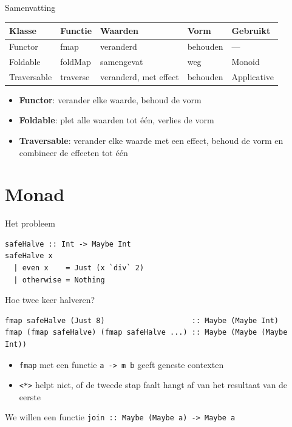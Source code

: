 \documentclass[aspectratio=169,11pt]{beamer}
\newcommand{\hs}{\lstinline[style=hsinline]}
\newcommand{\code}[1]{{\ttfamily\color{kuldonker}#1}}
\begin{document}
\begin{frame}{Samenvatting}
  \centering
  \begin{tabular}{lllll}
    \toprule
    \textbf{Klasse} & \textbf{Functie} & \textbf{Waarden} & \textbf{Vorm} & \textbf{Gebruikt} \\
    \midrule
    \code{Functor}     & \code{fmap}     & veranderd                 & behouden & --- \\
    \code{Foldable}    & \code{foldMap}  & samengevat                & weg      & \code{Monoid} \\
    \code{Traversable} & \code{traverse} & veranderd, \alert{met effect} & behouden & \code{Applicative} \\
    \bottomrule
  \end{tabular}

  \vspace{12pt}
  \begin{itemize}
    \item \textbf{Functor}: verander elke waarde, behoud de vorm
    \item \textbf{Foldable}: plet alle waarden tot één, verlies de vorm
    \item \textbf{Traversable}: verander elke waarde \alert{met een effect}, behoud de vorm
      en combineer de effecten tot één
  \end{itemize}
\end{frame}

\section{Monad}

\begin{frame}[fragile]{Het probleem}
\begin{lstlisting}
safeHalve :: Int -> Maybe Int
safeHalve x
  | even x    = Just (x `div` 2)
  | otherwise = Nothing
\end{lstlisting}

Hoe twee keer halveren?
\pause
\begin{lstlisting}
fmap safeHalve (Just 8)                    :: Maybe (Maybe Int)
fmap (fmap safeHalve) (fmap safeHalve ...) :: Maybe (Maybe (Maybe Int))
\end{lstlisting}
\pause 
\begin{itemize}
\item \hs|fmap| met een functie \hs|a -> m b| geeft \alert{geneste} contexten
\item \hs|<*>| helpt niet, of de tweede stap faalt hangt af van het \alert{resultaat} van de eerste
\end{itemize}
We willen een functie \hs|join :: Maybe (Maybe a) -> Maybe a|
\end{frame}
\end{document}

